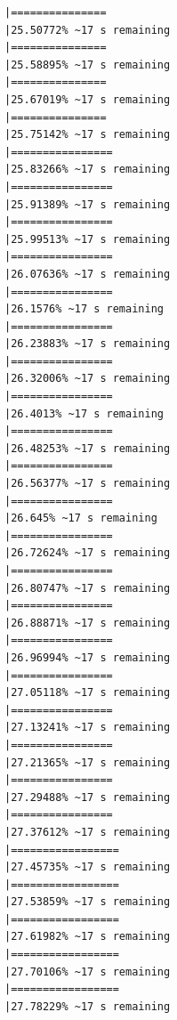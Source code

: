 \documentclass{article}\usepackage[]{graphicx}\usepackage[]{xcolor}
\makeatletter
\newenvironment{kframe}{%
 \def\at@end@of@kframe{}%
 \ifinner\ifhmode%
  \def\at@end@of@kframe{\end{minipage}}%
  \begin{minipage}{\columnwidth}%
 \fi\fi%
 \def\FrameCommand##1{\hskip\@totalleftmargin \hskip-\fboxsep
 \colorbox{shadecolor}{##1}\hskip-\fboxsep
     \hskip-\linewidth \hskip-\@totalleftmargin \hskip\columnwidth}%
 \MakeFramed {\advance\hsize-\width
   \@totalleftmargin\z@ \linewidth\hsize
   \@setminipage}}%
 {\par\unskip\endMakeFramed%
 \at@end@of@kframe}
\newenvironment{knitrout}{}{} %
\makeatother
\begin{document}
\begin{knitrout}
\begin{kframe}
\begin{verbatim}
|===============                                               |25.50772% ~17 s remaining 
|===============                                               |25.58895% ~17 s remaining 
|===============                                               |25.67019% ~17 s remaining 
|===============                                               |25.75142% ~17 s remaining 
|================                                              |25.83266% ~17 s remaining 
|================                                              |25.91389% ~17 s remaining 
|================                                              |25.99513% ~17 s remaining 
|================                                              |26.07636% ~17 s remaining 
|================                                              |26.1576% ~17 s remaining  
|================                                              |26.23883% ~17 s remaining 
|================                                              |26.32006% ~17 s remaining 
|================                                              |26.4013% ~17 s remaining  
|================                                              |26.48253% ~17 s remaining 
|================                                              |26.56377% ~17 s remaining 
|================                                              |26.645% ~17 s remaining   
|================                                              |26.72624% ~17 s remaining 
|================                                              |26.80747% ~17 s remaining 
|================                                              |26.88871% ~17 s remaining 
|================                                              |26.96994% ~17 s remaining 
|================                                              |27.05118% ~17 s remaining 
|================                                              |27.13241% ~17 s remaining 
|================                                              |27.21365% ~17 s remaining 
|================                                              |27.29488% ~17 s remaining 
|================                                              |27.37612% ~17 s remaining 
|=================                                             |27.45735% ~17 s remaining 
|=================                                             |27.53859% ~17 s remaining 
|=================                                             |27.61982% ~17 s remaining 
|=================                                             |27.70106% ~17 s remaining 
|=================                                             |27.78229% ~17 s remaining 

\end{verbatim}
\end{kframe}
\end{knitrout}
\end{document}
